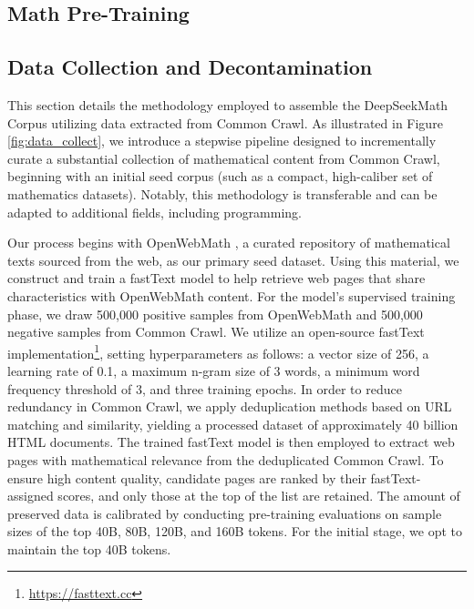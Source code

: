 \begin{itemize}[topsep=0pt]
\section{Math Pre-Training}

\subsection{Data Collection and Decontamination} This section details the methodology employed to assemble the DeepSeekMath Corpus utilizing data extracted from Common Crawl. As illustrated in Figure \ref{fig:data_collect}, we introduce a stepwise pipeline designed to incrementally curate a substantial collection of mathematical content from Common Crawl, beginning with an initial seed corpus (such as a compact, high-caliber set of mathematics datasets). Notably, this methodology is transferable and can be adapted to additional fields, including programming.

Our process begins with OpenWebMath \citep{openwebmath}, a curated repository of mathematical texts sourced from the web, as our primary seed dataset. Using this material, we construct and train a fastText model \citep{joulin2016fasttext} to help retrieve web pages that share characteristics with OpenWebMath content. For the model’s supervised training phase, we draw 500,000 positive samples from OpenWebMath and 500,000 negative samples from Common Crawl. We utilize an open-source fastText implementation\footnote{\url{https://fasttext.cc}}, setting hyperparameters as follows: a vector size of 256, a learning rate of 0.1, a maximum n-gram size of 3 words, a minimum word frequency threshold of 3, and three training epochs. In order to reduce redundancy in Common Crawl, we apply deduplication methods based on URL matching and similarity, yielding a processed dataset of approximately 40 billion HTML documents. The trained fastText model is then employed to extract web pages with mathematical relevance from the deduplicated Common Crawl. To ensure high content quality, candidate pages are ranked by their fastText-assigned scores, and only those at the top of the list are retained. The amount of preserved data is calibrated by conducting pre-training evaluations on sample sizes of the top 40B, 80B, 120B, and 160B tokens. For the initial stage, we opt to maintain the top 40B tokens.


\end{itemize}
